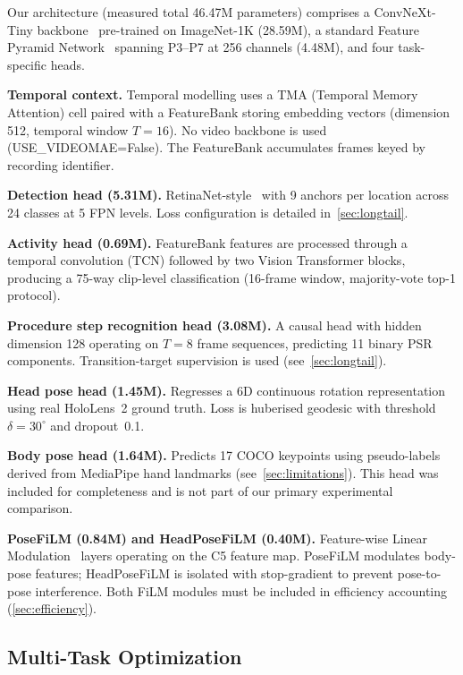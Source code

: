 \documentclass[conference]{IEEEtran}
\begin{document}
Our architecture (measured total 46.47M parameters) comprises a ConvNeXt-Tiny backbone~\cite{liu2022convnet} pre-trained on ImageNet-1K (28.59M), a standard Feature Pyramid Network~\cite{lin2017fpn} spanning P3--P7 at 256 channels (4.48M), and four task-specific heads.

\textbf{Temporal context.} Temporal modelling uses a TMA (Temporal Memory Attention) cell paired with a FeatureBank storing embedding vectors (dimension 512, temporal window $T=16$). No video backbone is used (USE\_VIDEOMAE=False). The FeatureBank accumulates frames keyed by recording identifier.

\textbf{Detection head (5.31M).} RetinaNet-style~\cite{lin2017focal} with 9 anchors per location across 24 classes at 5 FPN levels. Loss configuration is detailed in~\cref{sec:longtail}.

\textbf{Activity head (0.69M).} FeatureBank features are processed through a temporal convolution (TCN) followed by two Vision Transformer blocks, producing a 75-way clip-level classification (16-frame window, majority-vote top-1 protocol).

\textbf{Procedure step recognition head (3.08M).} A causal head with hidden dimension 128 operating on $T=8$ frame sequences, predicting 11 binary PSR components. Transition-target supervision is used (see~\cref{sec:longtail}).

\textbf{Head pose head (1.45M).} Regresses a 6D continuous rotation representation~\cite{zhou2019continuity} using real HoloLens~2 ground truth. Loss is huberised geodesic with threshold $\delta=30^\circ$ and dropout~0.1.

\textbf{Body pose head (1.64M).} Predicts 17 COCO keypoints using pseudo-labels derived from MediaPipe hand landmarks (see~\cref{sec:limitations}). This head was included for completeness and is not part of our primary experimental comparison.

\textbf{PoseFiLM (0.84M) and HeadPoseFiLM (0.40M).} Feature-wise Linear Modulation~\cite{perez2018film} layers operating on the C5 feature map. PoseFiLM modulates body-pose features; HeadPoseFiLM is isolated with stop-gradient to prevent pose-to-pose interference. Both FiLM modules must be included in efficiency accounting (\cref{sec:efficiency}).

\subsection{Multi-Task Optimization}
\label{sec:mtl}
\end{document}
